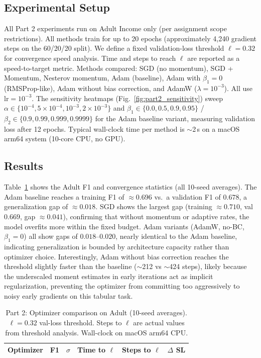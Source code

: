 \documentclass[letterpaper, 10 pt, conference]{ieeeconf}
\begin{document}
\subsection{Experimental Setup}

All Part 2 experiments run on Adult Income only (per assignment scope restrictions). All methods train for up to 20 epochs (approximately 4{,}240 gradient steps on the 60/20/20 split). We define a fixed validation-loss threshold $\ell = 0.32$ for convergence speed analysis. Time and steps to reach $\ell$ are reported as a speed-to-target metric. Methods compared: SGD (no momentum), SGD + Momentum, Nesterov momentum, Adam (baseline), Adam with $\beta_1 = 0$ (RMSProp-like), Adam without bias correction, and AdamW ($\lambda = 10^{-3}$). All use $\text{lr} = 10^{-3}$. The sensitivity heatmaps (Fig.~\ref{fig:part2_sensitivity}) sweep $\alpha \in \{10^{-4}, 5 \times 10^{-4}, 10^{-3}, 2 \times 10^{-3}\}$ and $\beta_1 \in \{0.0, 0.5, 0.9, 0.95\}$ / $\beta_2 \in \{0.9, 0.99, 0.999, 0.9999\}$ for the Adam baseline variant, measuring validation loss after 12 epochs. Typical wall-clock time per method is $\sim$2\,s on a macOS arm64 system (10-core CPU, no GPU).

\subsection{Results}

Table~\ref{tab:part2} shows the Adult F1 and convergence statistics (all 10-seed averages). The Adam baseline reaches a training F1 of $\approx 0.696$ vs.\ a validation F1 of $0.678$, a generalization gap of $\approx 0.018$. SGD shows the largest gap (training $\approx 0.710$, val $0.669$, gap $\approx 0.041$), confirming that without momentum or adaptive rates, the model overfits more within the fixed budget. Adam variants (AdamW, no-BC, $\beta_1{=}0$) all show gaps of $0.018$--$0.020$, nearly identical to the Adam baseline, indicating generalization is bounded by architecture capacity rather than optimizer choice. Interestingly, Adam without bias correction reaches the threshold slightly faster than the baseline ($\sim$212 vs $\sim$424 steps), likely because the underscaled moment estimates in early iterations act as implicit regularization, preventing the optimizer from committing too aggressively to noisy early gradients on this tabular task.

\begin{table}[!htbp]
    \centering
    \caption{Part 2: Optimizer comparison on Adult (10-seed averages). $\ell = 0.32$ val-loss threshold. Steps to $\ell$ are actual values from threshold analysis. Wall-clock on macOS arm64 CPU.}
    \label{tab:part2}
    \setlength{\tabcolsep}{1.5pt}
    \begin{tabular}{@{}lccccc@{}}
    \toprule
    Optimizer & F1 & $\sigma$ & Time to $\ell$ & Steps to $\ell$ & $\Delta$ SL \\
    \midrule
    
    \bottomrule
    \end{tabular}
\end{table}
\end{document}
